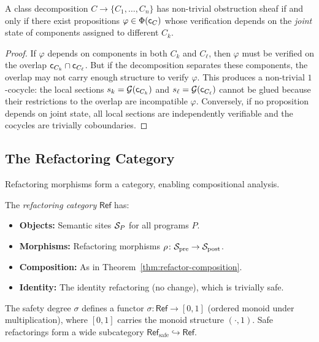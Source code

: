 \documentclass[11pt]{article}
\newcommand{\SitePre}{\Site_{\mathrm{pre}}}
\newcommand{\SitePost}{\Site_{\mathrm{post}}}
\newcommand{\RefactorMorph}{\rho}
\newcommand{\props}{\Phi}                           %
\newcommand{\SafeDeg}{\sigma}                        %
\newcommand{\RefCat}{\mathsf{Ref}}                  %
\begin{document}
\begin{proposition}\label{prop:decompose-obs}
A class decomposition $C \to \{C_1, \ldots, C_n\}$ has non-trivial
obstruction sheaf if and only if there exist propositions
$\varphi \in \props(\coord_C)$ whose verification depends on the
\emph{joint} state of components assigned to different $C_k$.
\end{proposition}

\begin{proof}
If $\varphi$ depends on components in both $C_k$ and $C_\ell$, then
$\varphi$ must be verified on the overlap $\mathsf{c}_{C_k} \cap
\mathsf{c}_{C_\ell}$.  But if the decomposition separates these components,
the overlap may not carry enough structure to verify $\varphi$.  This
produces a non-trivial $1$-cocycle: the local sections
$s_k = \mathcal{G}(\mathsf{c}_{C_k})$ and $s_\ell =
\mathcal{G}(\mathsf{c}_{C_\ell})$ cannot be glued because their
restrictions to the overlap are incompatible \wrt $\varphi$.
Conversely, if no proposition depends on joint state, all local sections
are independently verifiable and the cocycles are trivially coboundaries.
\end{proof}

\subsection{The Refactoring Category}\label{ssec:refactor-category}

Refactoring morphisms form a category, enabling compositional analysis.

\begin{definition}\label{def:refactor-category}
The \emph{refactoring category} $\RefCat$ has:
\begin{itemize}[noitemsep]
  \item \textbf{Objects:} Semantic sites $\mathcal{S}_P$ for all programs $P$.
  \item \textbf{Morphisms:} Refactoring morphisms
        $\RefactorMorph \colon \SitePre \to \SitePost$.
  \item \textbf{Composition:} As in
        Theorem~\ref{thm:refactor-composition}.
  \item \textbf{Identity:} The identity refactoring (no change),
        which is trivially safe.
\end{itemize}
\end{definition}

The safety degree $\SafeDeg$ defines a functor
$\SafeDeg \colon \RefCat \to [0,1]$ (ordered monoid under
multiplication), where $[0,1]$ carries the monoid structure
$(\cdot, 1)$.  Safe refactorings form a wide subcategory
$\RefCat_{\mathrm{safe}} \hookrightarrow \RefCat$.
\end{document}
